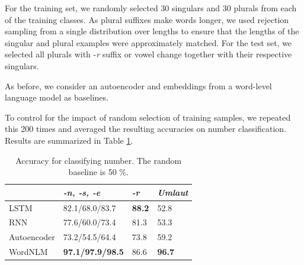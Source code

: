 For the training set, we randomly selected 30 singulars and 30 plurals from each of the training classes.
As plural suffixes make words longer, we used rejection sampling from a single distribution over lengths to ensure that the lengths of the singular and plural examples were approximately matched.
For the test set, we selected all plurals with -\emph{r} suffix or vowel change together with their respective singulars.

As before, we consider an autoencoder and embeddings from a word-level language model as baselines.

To control for the impact of random selection of training samples, we repeated this 200 times and averaged the resulting accuracies on number classification.
Results are summarized in Table \ref{tab:number-results}.


\begin{table}[t]
  \begin{center}
    \begin{tabular}{l|l|l|l}
      &\emph{-n, -s, -e}&\emph{-r}&\emph{Umlaut}\\      \hline
      LSTM& 82.1/68.0/83.7  & \textbf{88.2} & 52.8 \\
      RNN& 77.6/60.0/73.4 & 81.3 & 53.3\\
      Autoencoder& 73.2/54.5/64.4 & 73.8 & 59.2\\
      WordNLM& \textbf{97.1/97.9/98.5} & 86.6 & \textbf{96.7}  \\ %
    \end{tabular}
  \end{center}
  \caption{\label{tab:number-results} Accuracy for classifying number. The random baseline is 50 \%.}
\end{table}



